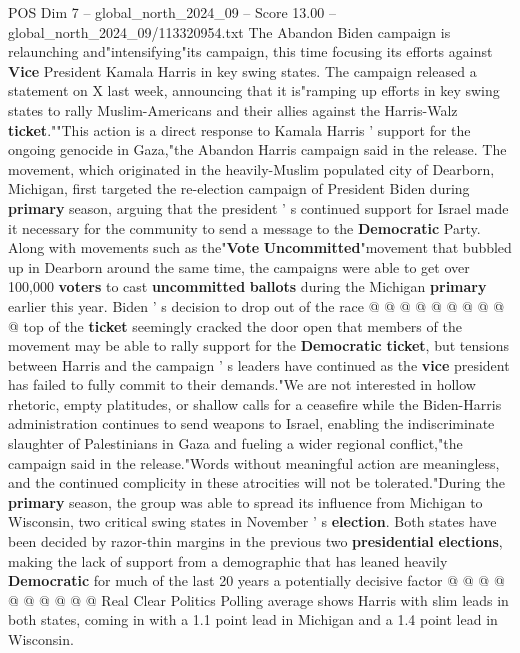 \begin{textsample}{POS Dim 7 – global\_north\_2024\_09 – Score 13.00 – global\_north\_2024\_09/113320954.txt}  \label{ex:f7_pos_077}
The Abandon Biden campaign is relaunching and"intensifying"its campaign, this time focusing its efforts against \textbf{Vice} President Kamala Harris in key swing states.
The campaign released a statement on X last week, announcing that it is"ramping up efforts in key swing states to rally Muslim-Americans and their allies against the Harris-Walz \textbf{ticket}.""This action is a direct response to Kamala Harris ' support for the ongoing genocide in Gaza,"the Abandon Harris campaign said in the release.
The movement, which originated in the heavily-Muslim populated city of Dearborn, Michigan, first targeted the re-election campaign of President Biden during \textbf{primary} season, arguing that the president ' s continued support for Israel made it necessary for the community to send a message to the \textbf{Democratic} Party.
Along with movements such as the"\textbf{Vote} \textbf{Uncommitted}"movement that bubbled up in Dearborn around the same time, the campaigns were able to get over 100,000 \textbf{voters} to cast \textbf{uncommitted} \textbf{ballots} during the Michigan \textbf{primary} earlier this year.
Biden ' s decision to drop out of the race @ @ @ @ @ @ @ @ @ @ top of the \textbf{ticket} seemingly cracked the door open that members of the movement may be able to rally support for the \textbf{Democratic} \textbf{ticket}, but tensions between Harris and the campaign ' s leaders have continued as the \textbf{vice} president has failed to fully commit to their demands."We are not interested in hollow rhetoric, empty platitudes, or shallow calls for a ceasefire while the Biden-Harris administration continues to send weapons to Israel, enabling the indiscriminate slaughter of Palestinians in Gaza and fueling a wider regional conflict,"the campaign said in the release."Words without meaningful action are meaningless, and the continued complicity in these atrocities will not be tolerated."During the \textbf{primary} season, the group was able to spread its influence from Michigan to Wisconsin, two critical swing states in November ' s \textbf{election}.
Both states have been decided by razor-thin margins in the previous two \textbf{presidential} \textbf{elections}, making the lack of support from a demographic that has leaned heavily \textbf{Democratic} for much of the last 20 years a potentially decisive factor @ @ @ @ @ @ @ @ @ @ Real Clear Politics Polling average shows Harris with slim leads in both states, coming in with a 1.1 point lead in Michigan and a 1.4 point lead in Wisconsin.

\end{textsample}
